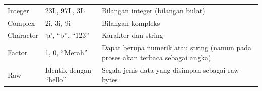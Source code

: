 \documentclass[]{book}
\begin{document}
\begin{longtable}[]{@{}lll@{}}
\begin{minipage}[t]{0.12\columnwidth}
Integer\strut
\end{minipage} & \begin{minipage}[t]{0.19\columnwidth}\raggedright\strut
23L, 97L, 3L\strut
\end{minipage} & \begin{minipage}[t]{0.60\columnwidth}\raggedright\strut
Bilangan integer (bilangan bulat)\strut
\end{minipage}\tabularnewline
\begin{minipage}[t]{0.12\columnwidth}\raggedright\strut
Complex\strut
\end{minipage} & \begin{minipage}[t]{0.19\columnwidth}\raggedright\strut
2i, 3i, 9i\strut
\end{minipage} & \begin{minipage}[t]{0.60\columnwidth}\raggedright\strut
Bilangan kompleks\strut
\end{minipage}\tabularnewline
\begin{minipage}[t]{0.12\columnwidth}\raggedright\strut
Character\strut
\end{minipage} & \begin{minipage}[t]{0.19\columnwidth}\raggedright\strut
`a', ``b'', ``123''\strut
\end{minipage} & \begin{minipage}[t]{0.60\columnwidth}\raggedright\strut
Karakter dan string\strut
\end{minipage}\tabularnewline
\begin{minipage}[t]{0.12\columnwidth}\raggedright\strut
Factor\strut
\end{minipage} & \begin{minipage}[t]{0.19\columnwidth}\raggedright\strut
1, 0, ``Merah''\strut
\end{minipage} & \begin{minipage}[t]{0.60\columnwidth}\raggedright\strut
Dapat berupa numerik atau string (namun pada proses akan terbaca sebagai
angka)\strut
\end{minipage}\tabularnewline
\begin{minipage}[t]{0.12\columnwidth}\raggedright\strut
Raw\strut
\end{minipage} & \begin{minipage}[t]{0.19\columnwidth}\raggedright\strut
Identik dengan ``hello''\strut
\end{minipage} & \begin{minipage}[t]{0.60\columnwidth}\raggedright\strut
Segala jenis data yang disimpan sebagai raw bytes\strut
\end{minipage}\tabularnewline
\bottomrule
\end{longtable}
\end{document}
